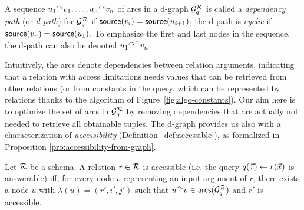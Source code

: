 \begin{definition}\label{def:d-path}
    A sequence $u_1 \mbox{$^{\curvearrowright}$} v_1, \dots, u_n \mbox{$^{\curvearrowright}$} v_n$ of arcs in a d-graph $\mathcal{G}_q^{\mathcal{R}}$ is called a \emph{dependency path} (or \emph{d-path}) for $\mathcal{G}_q^{\mathcal{R}}$ if $\mbox{\textsf{source}}(v_i) = \mbox{\textsf{source}}(u_{i+1})$; the d-path is \emph{cyclic} if $\mbox{\textsf{source}}(v_n) = \mbox{\textsf{source}}(u_1)$.
    To emphasize the first and last nodes in the sequence, the d-path can also be denoted $u_1 \mbox{$^{\curvearrowright^{+{}}}$} v_n$.
\end{definition}
%
Intuitively, the arcs denote dependencies between relation arguments, indicating that a relation with access limitations needs values that can be retrieved from other relations (or from constants in the query, which can be represented by relations thanks to the algorithm of Figure~\ref{fig:algo-constants}). Our aim here is to optimize the set of arcs in $\mathcal{G}_q^{\mathcal{R}}$ by removing dependencies that are actually not needed to retrieve all obtainable tuples. The d-graph provides us also with a characterization of \emph{accessibility} (Definition~\ref{def:accessible}), as formalized in Proposition \ref{pro:accessibility-from-graph}.
%
\begin{proposition}\label{pro:accessibility-from-graph}
	Let $\mathcal{R}$ be a schema. A relation $r \in \mathcal{R}$ is accessible (i.e. the query $q(\vec x) \leftarrow r(\vec x)$ is answerable) iff, for every node $v$ representing an input argument of $r$, there exists a node $u$ with $\lambda(u) = (r',i',j')$ such that $u \mbox{$^{\curvearrowright}$} v \in \textsf{arcs}(\mathcal{G}_q^{\mathcal{R}})$ and $r'$ is accessible.
\end{proposition}
